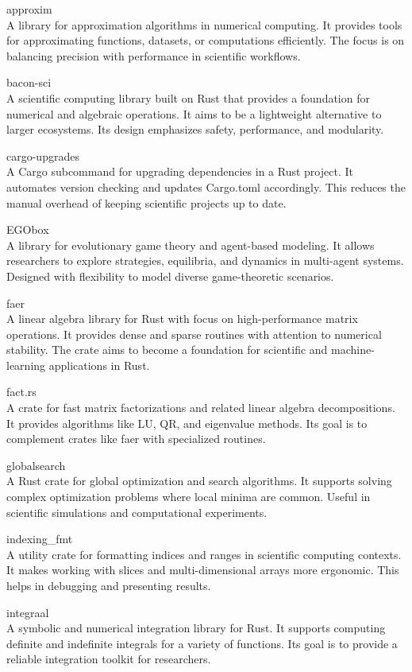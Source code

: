 \documentclass{article}
\begin{document}
approxim\\
A library for approximation algorithms in numerical computing. It provides tools for
approximating functions, datasets, or computations efficiently. The focus is on balancing precision
with performance in scientific workflows.

bacon-sci\\
A scientific computing library built on Rust that provides a foundation for numerical
and algebraic operations. It aims to be a lightweight alternative to larger ecosystems. Its design
emphasizes safety, performance, and modularity.

cargo-upgrades\\
A Cargo subcommand for upgrading dependencies in a Rust project. It automates
version checking and updates Cargo.toml accordingly. This reduces the manual overhead of keeping
scientific projects up to date.

EGObox\\
A library for evolutionary game theory and agent-based modeling. It allows researchers to
explore strategies, equilibria, and dynamics in multi-agent systems. Designed with flexibility to
model diverse game-theoretic scenarios.

faer\\
A linear algebra library for Rust with focus on high-performance matrix operations. It
provides dense and sparse routines with attention to numerical stability. The crate aims to become
a foundation for scientific and machine-learning applications in Rust.

fact.rs\\
A crate for fast matrix factorizations and related linear algebra decompositions. It
provides algorithms like LU, QR, and eigenvalue methods. Its goal is to complement crates like faer
with specialized routines.

globalsearch\\
A Rust crate for global optimization and search algorithms. It supports solving
complex optimization problems where local minima are common. Useful in scientific simulations and
computational experiments.

indexing\_fmt\\
A utility crate for formatting indices and ranges in scientific computing contexts.
It makes working with slices and multi-dimensional arrays more ergonomic. This helps in debugging
and presenting results.

integraal\\
A symbolic and numerical integration library for Rust. It supports computing definite
and indefinite integrals for a variety of functions. Its goal is to provide a reliable integration
toolkit for researchers.
\end{document}
